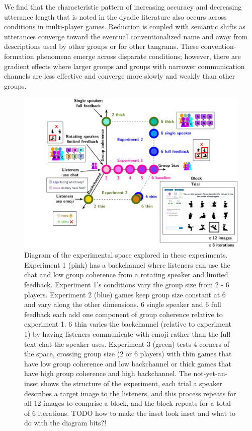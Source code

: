 \documentclass[
  english,
  a4paper,
]{article}
\begin{document}
We find that the characteristic pattern of increasing accuracy and decreasing utterance length that is noted in the dyadic literature also occurs across conditions in multi-player games. Reduction is coupled with semantic shifts as utterances converge toward the eventual conventionalized name and away from descriptions used by other groups or for other tangrams. These convention-formation phenomena emerge across disparate conditions; however, there are gradient effects where larger groups and groups with narrower communication channels are less effective and converge more slowly and weakly than other groups.

\begin{figure}[t!]

{\centering \includegraphics[width=1\linewidth]{expt-diagram} 

}

\caption{Diagram of the experimental space explored in these experiments. Experiment 1 (pink) has a backchannel where listeners can use the chat and low group coherence from a rotating speaker and limited feedback. Experiment 1's conditions vary the group size from 2 - 6 players. Experiment 2 (blue) games keep group size constant at 6 and vary along the other dimensions. 6 single speaker and 6 full feedback each add one component of group coherence relative to experiment 1. 6 thin varies the backchannel (relative to experiment 1) by having listeners communicate with emoji rather than the full text chat the speaker uses. Experiment 3 (green) tests 4 corners of the space, crossing group size (2 or 6 players) with thin games that have low group coherence and low backchannel or thick games that have high group coherence and high backchannel.  The not-yet-an-inset shows the structure of the experiment, each trial a speaker describes a target image to the listeners, and this process repeats for all 12 images to comprise a block, and the block repeats for a total of 6 iterations. TODO how to make the inset look inset and what to do with the diagram bits?!}\label{fig:diagram}
\end{figure}
\end{document}
